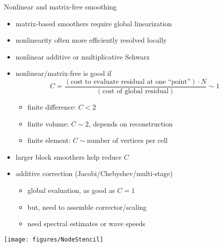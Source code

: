 \begin{frame}{Nonlinear and matrix-free smoothing}
  \begin{itemize}
  \item matrix-based smoothers require global linearization
  \item nonlinearity often more efficiently resolved locally
  \item nonlinear additive or multiplicative Schwarz
  \item nonlinear/matrix-free is good if
    \[ C = \frac{(\text{cost to evaluate residual at one ``point''}) \cdot N}{(\text{cost of global residual})} \sim 1 \]
    \begin{itemize}
    \item finite difference: $C < 2$
    \item finite volume: $C \sim 2$, depends on reconstruction
    \item finite element: $C \sim \text{number of vertices per cell}$
    \end{itemize}
  \item larger block smoothers help reduce $C$
  \item additive correction (Jacobi/Chebyshev/multi-stage)
    \begin{itemize}
    \item global evaluation, as good as $C=1$
    \item but, need to assemble corrector/scaling
    \item need spectral estimates or wave speeds
    \end{itemize}
  \end{itemize}
  \vspace{-4em}
  \hfill \texttt{[image: figures/NodeStencil]}
\end{frame}

